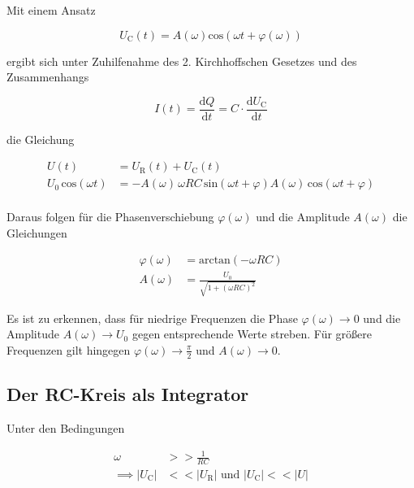 Mit einem Ansatz

\begin{equation} 
    U_\text{C}(t) = A(\omega) \text{cos}(\omega t + \varphi(\omega))
\end{equation}

ergibt sich unter Zuhilfenahme des 2. Kirchhoffschen Gesetzes und des Zusammenhangs

\begin{equation}
    \label{eqn:Stromstaerke}
    I(t) = \frac{\text{d}Q}{\text{d}t} = C \cdot \frac{\text{d}U_\text{C}}{\text{d}t}
\end{equation}

die Gleichung

\begin{equation}
    \label{eqn:Stromkreis}
    \begin{split}
        U(t) &= U_\text{R}(t) + U_\text{C}(t) \\
        U_0 \, \text{cos}(\omega t) &= -A(\omega) \, \omega RC \, \text{sin}(\omega t + \varphi)
        A(\omega) \, \text{cos}(\omega t + \varphi) 
    \end{split}
\end{equation}\\

Daraus folgen für die Phasenverschiebung $\varphi(\omega)$ und die Amplitude $A(\omega)$
die Gleichungen

\begin{align}
    \varphi(\omega) &= \text{arctan}(- \omega RC) \\
    A(\omega) &= \frac{U_0}{\sqrt{1 + (\omega RC)^2}}
\end{align}

Es ist zu erkennen, dass für niedrige Frequenzen die Phase $\varphi(\omega) \to 0$ und
die Amplitude $A(\omega) \to U_0$ gegen entsprechende Werte streben. Für größere
Frequenzen gilt hingegen $\varphi(\omega) \to \frac{\pi}{2}$ und $A(\omega) \to 0$.

\subsection{Der RC-Kreis als Integrator}

Unter den Bedingungen 

\begin{align*}
    \omega &>> \frac{1}{RC} \\
    \implies |U_\text{C}| &<< |U_\text{R}| \text{  und  } |U_\text{C}| << |U|
\end{align*}

